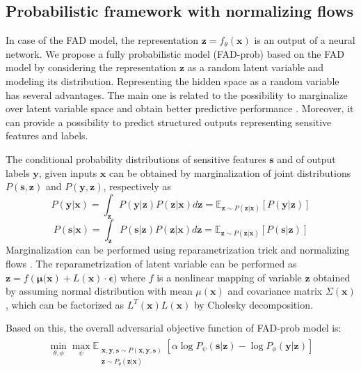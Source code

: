 \documentclass[preprint,12pt]{elsarticle}
\begin{document}
\subsection{Probabilistic framework with normalizing flows}
\label{Sec:advenet-nf}
In case of the FAD model, the representation $\mathbf{z}=f_\theta(\mathbf{x})$ is an output of a neural network. We propose a fully probabilistic model (FAD-prob) based on the FAD model by considering the representation $\mathbf{z}$ as a random latent variable and modeling its distribution. Representing the hidden space as a random variable has several advantages. The main one is related to the possibility to marginalize over latent variable space and obtain better predictive performance \cite{tan2010social}. Moreover, it can provide a possibility to predict structured outputs \cite{koller2009probabilistic} representing sensitive features and labels.

The conditional probability distributions of sensitive features $\mathbf{s}$ and of output labels $\mathbf{y}$,  given inputs $\mathbf{x}$ can be obtained by marginalization of joint distributions $P(\mathbf{s},\mathbf{z})$ and $P(\mathbf{y},\mathbf{z})$, respectively as
$$ P(\mathbf{y}|\mathbf{x}) = \int_\mathbf{z} P(\mathbf{y}|\mathbf{z}) P(\mathbf{z}|\mathbf{x}) d\mathbf{z} = \mathbb{E}_{\mathbf{z} \sim P(\mathbf{z}|\mathbf{x})} [P(\mathbf{y}|\mathbf{z})]$$
$$ P(\mathbf{s}|\mathbf{x}) = \int_\mathbf{z} P(\mathbf{s}|\mathbf{z}) P(\mathbf{z}|\mathbf{x}) d\mathbf{z} = \mathbb{E}_{\mathbf{z} \sim P(\mathbf{z}|\mathbf{x})} [P(\mathbf{s}|\mathbf{z})]$$
Marginalization can be performed using reparametrization trick and normalizing flows \cite{kingma2019introduction}. The reparametrization of latent variable can be performed as $\mathbf{z} = f(\mathbf{\mu(\mathbf{x}})+ L(\mathbf{x})\cdot \mathbf{\epsilon})$
where $f$ is a nonlinear mapping of variable $\mathbf{z}$ obtained by assuming normal distribution with mean $\mu(\mathbf{x})$ and covariance matrix $\Sigma(\mathbf{x})$, which can be factorized as $L^T(\mathbf{x})L(\mathbf{x})$ by Cholesky decomposition.

Based on this, the overall adversarial objective function of FAD-prob model is:
\begin{gather*}
\begin{split}
\min_{\theta,\phi}\max_{\psi}\mathbb{E}_{\substack{\mathbf{x},\mathbf{y}, \mathbf{s} \sim P(\mathbf{x},\mathbf{y},\mathbf{s})\\\mathbf{z} \sim P_\theta(\mathbf{z}|\mathbf{x})}} \left[\alpha \log P_{\psi}(\mathbf{s}|\mathbf{z})  - \log P_{\phi}(\mathbf{y}|\mathbf{z})\right]
\end{split}
\end{gather*}
\end{document}
